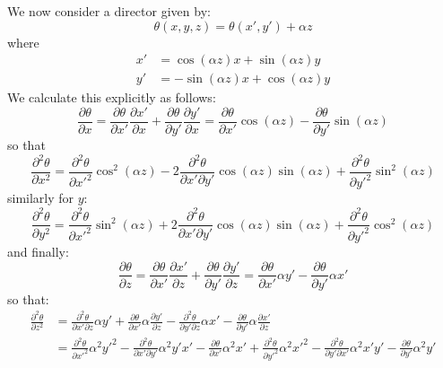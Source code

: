 \documentclass[reqno]{article}
\begin{document}
We now consider a director given by:
\begin{equation}
    \theta(x, y, z)
    =
    \theta(x', y') + \alpha z
\end{equation}
where
\begin{equation}
\begin{split}
    x' 
    &= 
    \cos(\alpha z) x + \sin(\alpha z) y \\
    y'
    &=
    -\sin(\alpha z) x + \cos(\alpha z) y
\end{split}
\end{equation}
We calculate this explicitly as follows:
\begin{equation}
    \frac{\partial \theta}{\partial x}
    =
    \frac{\partial \theta}{\partial x'} \frac{\partial x'}{\partial x}
    +
    \frac{\partial \theta}{\partial y'} \frac{\partial y'}{\partial x}
    =
    \frac{\partial \theta}{\partial x'} \cos(\alpha z)
    -
    \frac{\partial \theta}{\partial y'} \sin(\alpha z)
\end{equation}
so that
\begin{equation}
    \frac{\partial^2 \theta}{\partial x^2}
    =
    \frac{\partial^2 \theta}{\partial x'^2} \cos^2(\alpha z)
    -
    2 \frac{\partial^2 \theta}{\partial x' \partial y'} \cos(\alpha z) \sin(\alpha z)
    +
    \frac{\partial^2 \theta}{\partial y'^2} \sin^2(\alpha z)
\end{equation}
similarly for $y$:
\begin{equation}
    \frac{\partial^2 \theta}{\partial y^2}
    =
    \frac{\partial^2 \theta}{\partial x'^2} \sin^2(\alpha z)
    +
    2 \frac{\partial^2 \theta}{\partial x' \partial y'} \cos(\alpha z) \sin(\alpha z)
    +
    \frac{\partial^2 \theta}{\partial y'^2} \cos^2(\alpha z)
\end{equation}
and finally:
\begin{equation}
    \frac{\partial \theta}{\partial z}
    =
    \frac{\partial \theta}{\partial x'} \frac{\partial x'}{\partial z}
    +
    \frac{\partial \theta}{\partial y'} \frac{\partial y'}{\partial z}
    =
    \frac{\partial \theta}{\partial x'} \alpha y'
    -
    \frac{\partial \theta}{\partial y'} \alpha x'
\end{equation}
so that:
\begin{equation}
\begin{split}
    \frac{\partial^2 \theta}{\partial z^2}
    &=
    \frac{\partial^2 \theta}{\partial x' \partial z} \alpha y'
    + 
    \frac{\partial \theta}{\partial x'} \alpha \frac{\partial y'}{\partial z}
    - 
    \frac{\partial^2 \theta}{\partial y' \partial z} \alpha x'
    -
    \frac{\partial \theta}{\partial y'} \alpha \frac{\partial x'}{\partial z} \\
    &=
    \frac{\partial^2 \theta}{\partial x'^2} \alpha^2 y'^2
    - 
    \frac{\partial^2 \theta}{\partial x' \partial y'} \alpha^2 y' x'
    -
    \frac{\partial \theta}{\partial x'} \alpha^2 x'
    + 
    \frac{\partial^2 \theta}{\partial y'^2} \alpha^2 x'^2
    -
    \frac{\partial^2 \theta}{\partial y' \partial x'} \alpha^2 x' y'
    -
    \frac{\partial \theta}{\partial y'} \alpha^2 y'
\end{split}
\end{equation}
\end{document}
